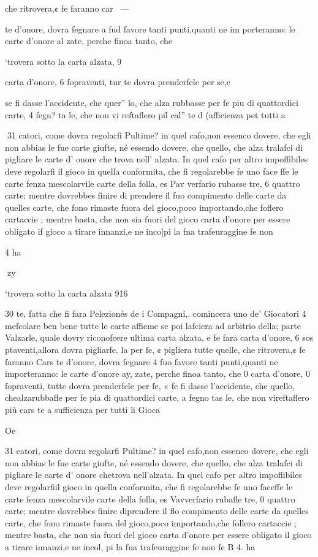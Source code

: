 \documentclass[12pt,a6paper]{article}
\begin{document}
che ritrovera,¢ fe faranno car~ —

te d’onore, dovra fegnare a fud
favore tanti punti,quanti ne im
porteranno: le carte d’onore al
zate, perche finoa tanto, che

‘trovera sotto la carta alzata, 9

carta d’onore, 6 fopraventi, tur
te dovra prenderfele per se,e

se fi dasse l’accidente, che quer”
lo, che alza rubbasse per fe piu
di quattordici carte, 4 fegn? ta
le, che non vi reftaflero pil cal”
te d (afficienza pet tutti a

 
31
catori, come dovra regolarfi
Pultime? in quel cafo,non essenco dovere, che egli non abbias
le fue carte giufte, né essendo
dovere, che quello, che alza
tralafci di pigliare le carte d’
onore che trova nell’ alzata. In
quel cafo per altro impoffibiles
deve regolarfi il gioco in quella
conformita, che fi regolarebbe
fe uno face ffe le carte fenza mescolarvile carte della folla, es
Pav verfario rubasse tre, 6 quattro carte; mentre dovrebbes
finire di prendere il fuo compimento delle carte da quelles
carte, che fono rimaste fuora
del gioco,poco importando,che
foflero cartaccie ; mentre basta,
che non sia fuori del gioco carta d’onore per essere obligato if
gioco a tirare innanzi,e ne inco]pi la fna trafeuraggine fe non

4 ha

 

 
zy

‘trovera sotto la carta alzata 916

30
te, fatta che fi fara Pelezionés
de i Compagni,. comincera uno
de’ Giocatori 4 mefcolare ben
bene tutte le carte affieme se
poi lafciera ad arbitrio della;
parte Valzarle, quale dovry
riconofcere ultima carta alzata, e fe fara carta d’onore, 6 sos
ptaventi,allora dovra pigliarfe.
la per fe, ¢ pigliera tutte quelle,
che ritrovera,¢ fe faranno Cars
te d’onore, dovra fegnare 4 fuo
favore tanti punti,quanti ne importeranno: le carte d’onore ay,
zate, perche finoa tanto, che
0
carta d’onore, 0 fopraventi, tutte dovra prenderfele per fe, «
fe fi dasse l’accidente, che quello, chealzarubbafle per fe pia
di quattordici carte, a fegno tas
le, che non vireftaflero più cars
te a sufficienza per tutti li Gioca 

Oe

31
eatori, come dovra regolarfi
Pultime? in quel cafo,non essenco dovere, che egli non abbias
le fue carte giufte, né essendo
dovere, che quello, che alza
tralafci di pigliare le carte d’
onore chetrova nell’alzata. In
quel cafo per altro impoflibiles
deve regolarfiil gioco in quella
conformita, che fi regolarebbe
fe uno faceffe le carte fenza mescolarvile carte della folla, es
Vavverfario rubafle tre, 0 quattro carte; mentre dovrebbes
finire diprendere il flo compimento delle carte da quelles
carte, che fono rimaste fuora
del gioco,poco importando,che
follero cartaccie ; mentre basta,
che non sia fuori del gioco carta d’onore per essere obligato il
gioco a tirare innanzi,e ne incol, pi la fua trafeuraggine fe non
fe B 4. ha
 
\end{document}
